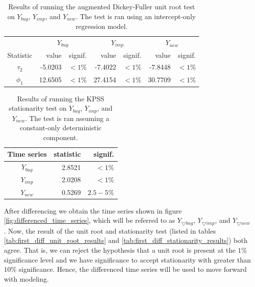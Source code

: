 \documentclass[a4paper]{scrartcl}
\begin{document}
\begin{table}[h!]
  \centering
  \begin{tabular}{ c | r r | r r | r r }
      & \multicolumn{2}{|c|}{$Y_{bug}$} & \multicolumn{2}{|c|}{$Y_{imp}$} & \multicolumn{2}{|c}{$Y_{new}$} \\
    Statistic & value & signif. & value & signif. & value & signif. \\
    \hline
    $\tau_2$ & -5.0203 & $< 1\%$ & -7.4022 & $< 1\%$ & -7.8448 & $< 1\%$ \\
    $\phi_1$ & 12.6505 & $< 1\%$ & 27.4154 & $< 1\%$ & 30.7709 & $< 1\%$ \\
    \hline
  \end{tabular}
\caption{Results of running the augmented Dickey-Fuller unit root test on $Y_{bug}$, $Y_{imp}$, and $Y_{new}$. The test is ran using an intercept-only regression model.}
\label{tab:unit_root_results}
\end{table}

\begin{table}[h!]
  \centering
  \begin{tabular}{ c | r r }
    Time series & statistic & signif. \\
    \hline
    $Y_{bug}$ & 2.8521 & $< 1\%$ \\
    $Y_{imp}$ & 2.0208 & $< 1\%$ \\
    $Y_{new}$ & 0.5269 & $2.5-5\%$ \\
    \hline
  \end{tabular}
\caption{Results of running the KPSS stationarity test on $Y_{bug}$, $Y_{imp}$, and $Y_{new}$. The test is ran assuming a constant-only deterministic component.}
\label{tab:stationarity_results}
\end{table}

After differencing we obtain the time series shown in figure \ref{fig:differenced_time_series}, which will be referred to as $Y_{\bigtriangledown bug}$, $Y_{\bigtriangledown imp}$, and $Y_{\bigtriangledown new}$. Now, the result of the unit root and stationarity test (listed in tables \ref{tab:first_diff_unit_root_results} and \ref{tab:first_diff_stationarity_results}) both agree. That is, we can reject the hypothesis that a unit root is present at the $1\%$  significance level and we have significance to accept stationarity with greater than $10\%$ significance. Hence, the differenced time series will be used to move forward with modeling.
\end{document}
